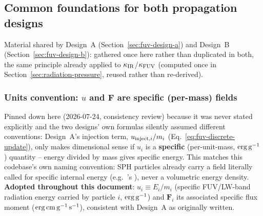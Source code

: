 \subsection{Common foundations for both propagation designs}
\label{sec:fuv-common}

Material shared by Design~A (Section~\ref{sec:fuv-design-a}) and
Design~B (Section~\ref{sec:fuv-design-b}): gathered once here rather
than duplicated in both, the same principle already applied to
$\kappa_{\rm IR}$/$\kappa_{\rm FUV}$ (computed once in
Section~\ref{sec:radiation-pressure}, reused rather than re-derived).

\subsubsection{Units convention: $u$ and $\mathbf F$ are specific
(per-mass) fields}
\label{sec:fuv-units}

Pinned down here (2026-07-24, consistency review) because it was never
stated explicitly and the two designs' own formulas silently assumed
different conventions: Design~A's injection term,
$u_{{\rm inject},i}/m_i$ (Eq.~\ref{eq:fuv-discrete-update}), only makes
dimensional sense if $u_i$ is a \textbf{specific} (per-unit-mass, ${\rm
erg\,g^{-1}}$) quantity -- energy divided by mass gives specific
energy. This matches this codebase's own naming convention: SPH
particles already carry a field literally called  for specific
internal energy (e.g.\ 's
), never a volumetric energy density. \textbf{Adopted
throughout this document}: $u_i\equiv E_i/m_i$ (specific FUV/LW-band
radiation energy carried by particle $i$, ${\rm erg\,g^{-1}}$) and
$\mathbf F_i$ its associated specific flux moment (${\rm erg\,cm\,
g^{-1}\,s^{-1}}$), consistent with Design~A as originally written.


